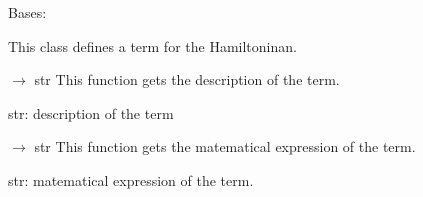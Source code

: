 \documentclass[letterpaper,10pt,english]{sphinxmanual}
\begin{document}

\begin{fulllineitems}
\label{\detokenize{scrimp:scrimp.hamiltonian.Term}}
\pysigstartsignatures
\pysiglinewithargsret
{}
{\sphinxparamcomma {}\sphinxparamcomma {}\sphinxparamcomma {}}
{}
\pysigstopsignatures
\sphinxAtStartPar
Bases: 

\sphinxAtStartPar
This class defines a term for the Hamiltoninan.

\begin{fulllineitems}
\label{\detokenize{scrimp:scrimp.hamiltonian.Term.get_description}}
\pysigstartsignatures
\pysiglinewithargsret
{}
{}
{{ $\rightarrow$ str}}
\pysigstopsignatures
\sphinxAtStartPar
This function gets the description of the term.
\begin{description}
\sphinxAtStartPar
str: description of the term

\end{description}

\end{fulllineitems}


\begin{fulllineitems}
\label{\detokenize{scrimp:scrimp.hamiltonian.Term.get_expression}}
\pysigstartsignatures
\pysiglinewithargsret
{}
{}
{{ $\rightarrow$ str}}
\pysigstopsignatures
\sphinxAtStartPar
This function gets the matematical expression of the term.
\begin{description}
\sphinxAtStartPar
str: matematical expression of the term.


\end{description}
\end{fulllineitems}
\end{fulllineitems}
\end{document}
